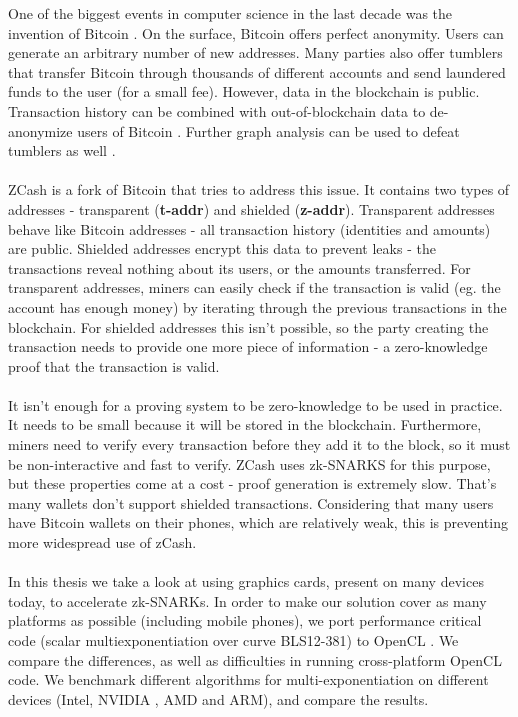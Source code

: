 One of the biggest events in computer science in the last decade was the invention of Bitcoin \cite{nakamoto2008bitcoin}. On the surface, Bitcoin offers perfect anonymity. Users can generate an arbitrary number of new addresses. Many parties also offer tumblers that transfer Bitcoin through thousands of different accounts and send laundered funds to the user (for a small fee). However, data in the blockchain is public. Transaction history can be combined with out-of-blockchain data to de-anonymize users of Bitcoin \cite{biryukov2014deanonymisation}. Further graph analysis can be used to defeat tumblers as well \cite{de2017analysis}.\\
\\
ZCash \cite{zcashprotocol} is a fork of Bitcoin that tries to address this issue. It contains two types of addresses - transparent (\textbf{t-addr}) and shielded (\textbf{z-addr}). Transparent addresses behave like Bitcoin addresses - all transaction history (identities and amounts) are public. Shielded addresses encrypt this data to prevent leaks - the transactions reveal nothing about its users, or the amounts transferred. For transparent addresses, miners can easily check if the transaction is valid (eg. the account has enough money) by iterating through the previous transactions in the blockchain. For shielded addresses this isn't possible, so the party creating the transaction needs to provide one more piece of information - a zero-knowledge proof that the transaction is valid. \\
\\
It isn't enough for a proving system to be zero-knowledge to be used in practice. It needs to be small because it will be stored in the blockchain. Furthermore, miners need to verify every transaction before they add it to the block, so it must be non-interactive and fast to verify. ZCash uses zk-SNARKS for this purpose, but these properties come at a cost - proof generation is extremely slow. That's many wallets don't support shielded transactions. Considering that many users have Bitcoin wallets on their phones, which are relatively weak, this is preventing more widespread use of zCash.\\
\\
In this thesis we take a look at using graphics cards, present on many devices today, to accelerate zk-SNARKs. In order to make our solution cover as many platforms as possible (including mobile phones), we port performance critical code (scalar multiexponentiation over curve BLS12-381) to OpenCL \cite{stone2010opencl}. We compare the differences, as well as difficulties in running cross-platform OpenCL code. We benchmark different algorithms for multi-exponentiation on different devices (Intel, NVIDIA , AMD and ARM), and compare the results.\\
